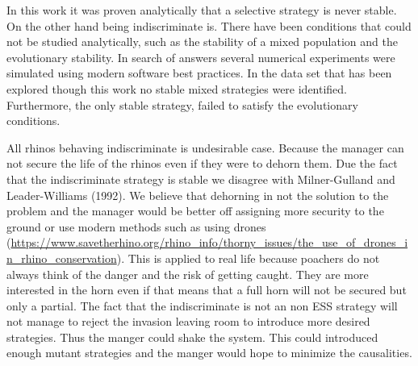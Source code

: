 \documentclass[10pt]{article}
\begin{document}
In this work it was proven analytically that a selective strategy is never stable. 
On the other hand being indiscriminate is. There have been conditions
that could not be studied analytically, such as the stability of a mixed 
population and the evolutionary stability. In search of answers several
numerical experiments were simulated using modern software best 
practices. In the data set that has been explored though this work no stable
mixed strategies were identified. Furthermore, the only stable strategy, failed
to satisfy the evolutionary conditions. 

All rhinos behaving indiscriminate is undesirable case. Because the manager can
not secure the life of the rhinos even if they were to dehorn them. Due the fact 
that the indiscriminate strategy is stable we disagree with Milner-Gulland and
Leader-Williams (1992). We believe that dehorning in not the 
solution to the problem and the manager would be better off assigning more 
security to the ground or use modern methods such as using drones
(\url{https://www.savetherhino.org/rhino_info/thorny_issues/the_use_of_drones_in_rhino_conservation}).
This is applied to real life because poachers 
do not always think of the danger and the risk of getting caught.
They are more interested in the horn even if that means that a full horn will
not be secured but only a partial. The fact that the indiscriminate is not
an non ESS strategy will not manage to reject the invasion leaving
room to introduce more desired strategies.
Thus the manger could shake  the system. This
could introduced enough mutant strategies and the manger would
hope to minimize the causalities.



\end{document}
